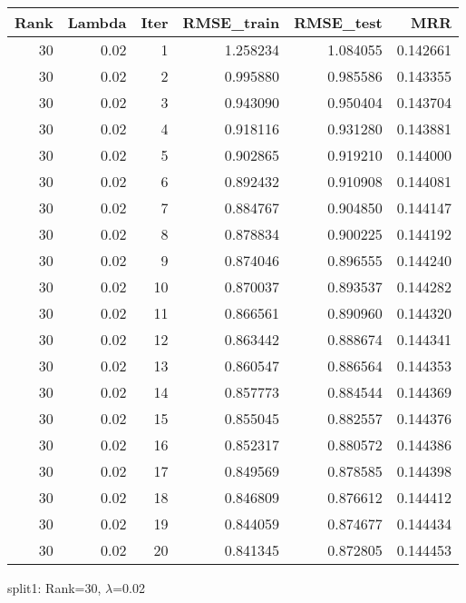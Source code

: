 \begin{tabular}{rrrrrr}
\toprule
 Rank &  Lambda &  Iter &  RMSE\_train &  RMSE\_test &       MRR \\
\midrule
   30 &    0.02 &     1 &    1.258234 &   1.084055 &  0.142661 \\
   30 &    0.02 &     2 &    0.995880 &   0.985586 &  0.143355 \\
   30 &    0.02 &     3 &    0.943090 &   0.950404 &  0.143704 \\
   30 &    0.02 &     4 &    0.918116 &   0.931280 &  0.143881 \\
   30 &    0.02 &     5 &    0.902865 &   0.919210 &  0.144000 \\
   30 &    0.02 &     6 &    0.892432 &   0.910908 &  0.144081 \\
   30 &    0.02 &     7 &    0.884767 &   0.904850 &  0.144147 \\
   30 &    0.02 &     8 &    0.878834 &   0.900225 &  0.144192 \\
   30 &    0.02 &     9 &    0.874046 &   0.896555 &  0.144240 \\
   30 &    0.02 &    10 &    0.870037 &   0.893537 &  0.144282 \\
   30 &    0.02 &    11 &    0.866561 &   0.890960 &  0.144320 \\
   30 &    0.02 &    12 &    0.863442 &   0.888674 &  0.144341 \\
   30 &    0.02 &    13 &    0.860547 &   0.886564 &  0.144353 \\
   30 &    0.02 &    14 &    0.857773 &   0.884544 &  0.144369 \\
   30 &    0.02 &    15 &    0.855045 &   0.882557 &  0.144376 \\
   30 &    0.02 &    16 &    0.852317 &   0.880572 &  0.144386 \\
   30 &    0.02 &    17 &    0.849569 &   0.878585 &  0.144398 \\
   30 &    0.02 &    18 &    0.846809 &   0.876612 &  0.144412 \\
   30 &    0.02 &    19 &    0.844059 &   0.874677 &  0.144434 \\
   30 &    0.02 &    20 &    0.841345 &   0.872805 &  0.144453 \\
\bottomrule
\end{tabular}

\caption{split1: Rank=30, $\lambda$=0.02}
